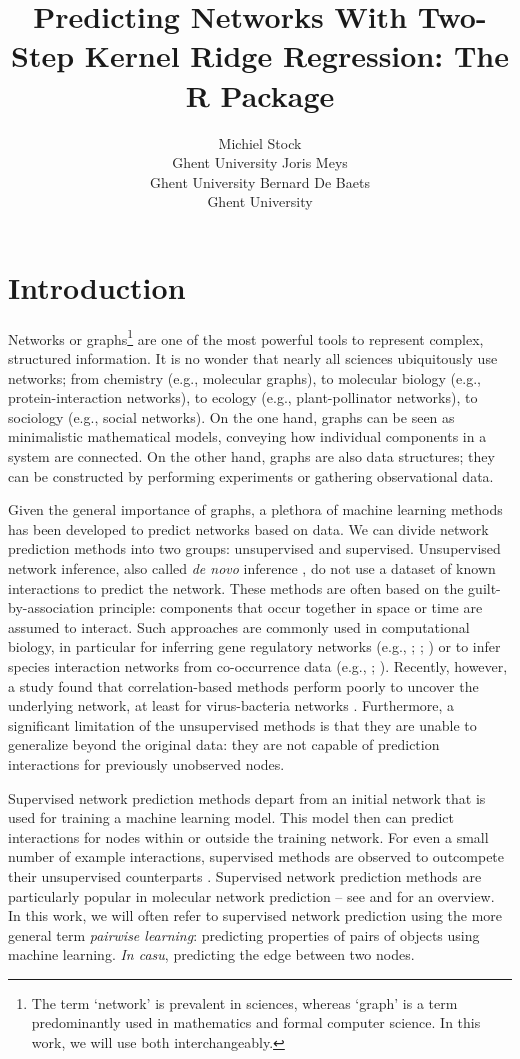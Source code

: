 \documentclass[
]{article}
\author{
Michiel Stock\\Ghent University \And Joris Meys\\Ghent University \And Bernard De Baets\\Ghent University
}
\title{Predicting Networks With Two-Step Kernel Ridge Regression: The R Package
\pkg{xnet}}
\begin{document}
\hypertarget{introduction}{%
\section{Introduction}\label{introduction}}

Networks or graphs\footnote{The term `network' is prevalent in sciences,
  whereas `graph' is a term predominantly used in mathematics and formal
  computer science. In this work, we will use both interchangeably.} are
one of the most powerful tools to represent complex, structured
information. It is no wonder that nearly all sciences ubiquitously use
networks; from chemistry (e.g., molecular graphs), to molecular biology
(e.g., protein-interaction networks), to ecology (e.g., plant-pollinator
networks), to sociology (e.g., social networks). On the one hand, graphs
can be seen as minimalistic mathematical models, conveying how
individual components in a system are connected. On the other hand,
graphs are also data structures; they can be constructed by performing
experiments or gathering observational data.

Given the general importance of graphs, a plethora of machine learning
methods has been developed to predict networks based on data. We can
divide network prediction methods into two groups: unsupervised and
supervised. Unsupervised network inference, also called \emph{de novo}
inference \citep{Vert2008}, do not use a dataset of known interactions
to predict the network. These methods are often based on the
guilt-by-association principle: components that occur together in space
or time are assumed to interact. Such approaches are commonly used in
computational biology, in particular for inferring gene regulatory
networks (e.g., \citet{Huynh-Thu2010}; \citet{Marbach2012};
\citet{Maetschke2014}) or to infer species interaction networks from
co-occurrence data (e.g., \citet{Basnou2015}; \citet{Cazelles2016}).
Recently, however, a study found that correlation-based methods perform
poorly to uncover the underlying network, at least for virus-bacteria
networks \citep{Coenen2018}. Furthermore, a significant limitation of
the unsupervised methods is that they are unable to generalize beyond
the original data: they are not capable of prediction interactions for
previously unobserved nodes.

Supervised network prediction methods depart from an initial network
that is used for training a machine learning model. This model then can
predict interactions for nodes within or outside the training network.
For even a small number of example interactions, supervised methods are
observed to outcompete their unsupervised counterparts
\citep{Cazelles2016}. Supervised network prediction methods are
particularly popular in molecular network prediction -- see
\citet{Vert2008} and \citet{Ding2013} for an overview. In this work, we
will often refer to supervised network prediction using the more general
term \emph{pairwise learning}: predicting properties of pairs of objects
using machine learning. \emph{In casu}, predicting the edge between two
nodes.
\end{document}
